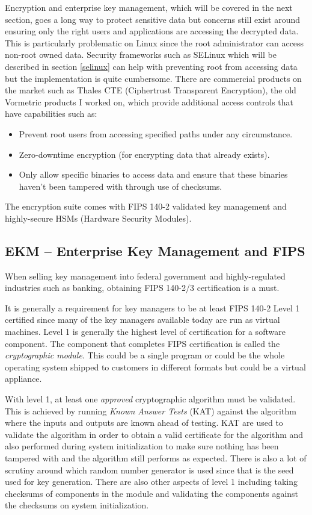 Encryption and enterprise key management, which will be covered in the next section, goes a long way to protect sensitive data but concerns still exist around ensuring only the right users and applications are accessing the decrypted data. This is particularly problematic on Linux since the root administrator can access non-root owned data. Security frameworks such as SELinux which will be described in section \ref{selinux} can help with preventing root from accessing data but the implementation is quite cumbersome. There are commercial products on the market such as Thales CTE (Ciphertrust Transparent Encryption), the old Vormetric products I worked on, which provide additional access controls that have capabilities such as:

\begin{itemize}
	\item Prevent root users from accessing specified paths under any circumstance.
	\item Zero-downtime encryption (for encrypting data that already exists).
	\item Only allow specific binaries to access data and ensure that these binaries haven't been tampered with through
		use of checksums.
\end{itemize}

\noindent
The encryption suite comes with FIPS 140-2 validated key management and highly-secure HSMs (Hardware Security Modules).

\subsection{EKM -- Enterprise Key Management and FIPS}

When selling key management into federal government and highly-regulated industries such as banking, obtaining FIPS 140-2/3 certification is a must.

It is generally a requirement for key managers to be at least FIPS 140-2 Level 1 certified since many of the key managers available today are run as virtual machines. Level 1 is generally the highest level of certification for a software component. The component that completes FIPS certification is called the \textit{cryptographic module}. This could be a single program or could be the whole operating system shipped to customers in different formats but could be a virtual appliance.

With level 1, at least one \textit{approved} cryptographic algorithm must be validated. This is achieved by running \textit{Known Answer Tests} (KAT) against the algorithm where the inputs and outputs are known ahead of testing. KAT are used to validate the algorithm in order to obtain a valid certificate for the algorithm and also performed during system initialization to make sure nothing has been tampered with and the algorithm still performs as expected. There is also a lot of scrutiny around which random number generator is used since that is the seed used for key generation. There are also other aspects of level 1 including taking checksums of components in the module and validating the components against the checksums on system initialization.

